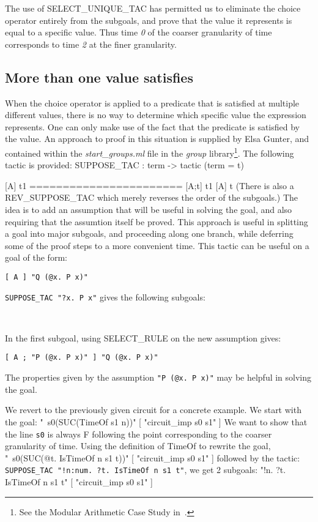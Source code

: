 The use of SELECT\_UNIQUE\_TAC has permitted us to eliminate the
choice operator entirely from the subgoals, and prove that the value
it represents is equal to a specific value.  Thus time {\it 0\/} of the
coarser granularity of time corresponds to time {\it 2\/} at the finer
granularity.  

\subsection{More than one value satisfies}\label{sec:many}

When the choice operator is applied to a predicate that is satisfied
at multiple different values, there is no way to determine which
specific value the expression represents.  One can only make use of
the fact that the predicate is satisfied by the value.  An approach to
proof in this situation is supplied by Elsa Gunter, and contained
within the {\it start\_groups.ml\/} file in the {\it group\/}
library\footnote{See the Modular Arithmetic Case Study
in~\cite{Hol89c}.}.  The following tactic is provided:
\begintt
SUPPOSE_TAC : term -> tactic  (term = t)

            [A] t1
    =======================
       [A;t] t1    [A] t
\endtt
(There is also a REV\_SUPPOSE\_TAC which merely reverses the order of
the subgoals.)  The idea is to add an assumption that will be useful
in solving the goal, and also requiring that the assumtion itself be
proved.  This approach is useful in splitting a goal into major
subgoals, and proceeding along one branch, while deferring some of the
proof steps to a more convenient time.  This tactic can be useful on a
goal of the form:
\begin{center}
\verb+[ A ] "Q (@x. P x)"+
\end{center}
\verb+SUPPOSE_TAC "?x. P x"+ gives the following subgoals:
\vspace{-\parskip}
\begin{center}
\\
\end{center}
In the first subgoal, using SELECT\_RULE on the new assumption gives:
\begin{center}
\verb+[ A ; "P (@x. P x)" ] "Q (@x. P x)"+
\end{center}
The properties given by the assumption \verb+"P (@x. P x)"+ may be
helpful in solving the goal.

We revert to the previously given circuit for a concrete example.  We
start with the goal:
\begintt
"~s0(SUC(TimeOf s1 n))"
    [ "circuit_imp s0 s1" ]
\endtt
We want to show that the line \verb+s0+ is always F following the
point corresponding to the coarser granularity of time.  Using the
definition of TimeOf to rewrite the goal,
\begintt
"~s0(SUC(@t. IsTimeOf n s1 t))"
    [ "circuit_imp s0 s1" ]
\endtt
followed by the tactic:
\verb+SUPPOSE_TAC "!n:num. ?t. IsTimeOf n s1 t"+, we get 2 subgoals:
\begintt
"!n. ?t. IsTimeOf n s1 t"
    [ "circuit_imp s0 s1" ]

